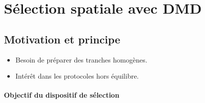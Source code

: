 %
%



\section{Sélection spatiale avec DMD}
\subsection{Motivation et principe}
{\color{blue}
\begin{itemize}
    \item Besoin de préparer des tranches homogènes.
    \item Intérêt dans les protocoles hors équilibre.
\end{itemize}
}

\paragraph{Objectif du dispositif de sélection}

